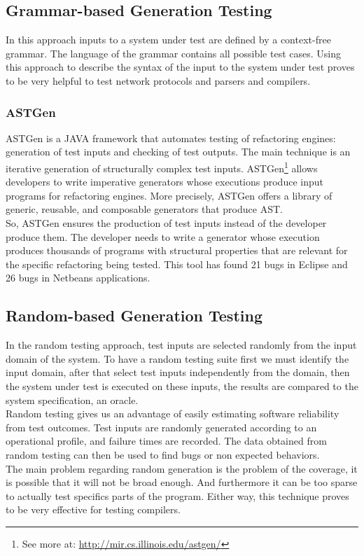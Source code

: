 \subsection{Grammar-based Generation Testing}
In this approach inputs to a system under test are defined by a context-free grammar. The language of the grammar contains all possible test cases.
Using this approach to describe the syntax of the input to the system under test proves to be very helpful to test
network protocols\cite{tal:syntax-based,kaksonen2001functional} and parsers and compilers\cite{1994-burgess,Burgess_Saidi_1996}.

\subsubsection{ASTGen}
ASTGen\cite{Daniel:2007:ATR:1287624.1287651} is a JAVA framework that automates testing of refactoring engines: generation of test inputs
and checking of test outputs. The main technique is an iterative generation of structurally complex test inputs.
ASTGen\footnote{See more at: \url{http://mir.cs.illinois.edu/astgen/}} allows developers to write imperative generators whose executions
produce input programs for refactoring engines. More precisely, ASTGen
offers a library of generic, reusable, and composable generators that produce \ac{AST}.\\
So, ASTGen ensures the production of test inputs instead of the developer produce them. The developer needs to write a generator whose execution
produces thousands of programs with structural properties that are relevant for the specific refactoring being tested. This tool has found
21 bugs in Eclipse and 26 bugs in Netbeans applications.

\subsection{Random-based Generation Testing}
In the random testing approach, test inputs are selected randomly from the input domain of the system.
To have a random testing suite first we must identify the input domain, after that select test inputs independently from the domain,
then the system under test is executed on these inputs, the results are compared to the system specification, an oracle.\\
Random testing gives us an advantage of easily estimating software reliability from test outcomes.
Test inputs are randomly generated according to an operational profile, and failure times are recorded.
The data obtained from random testing can then be used to find bugs or non expected behaviors.\\
\indent The main problem regarding random generation is the problem of the coverage, it is possible that it will not be broad enough. And furthermore it can be
too sparse to actually test specifics parts of the program. Either way, this technique proves to be very effective for testing compilers.

